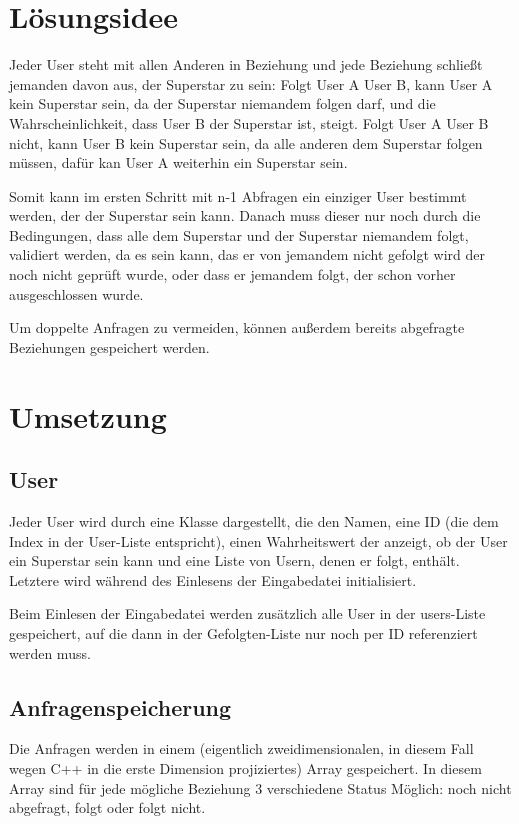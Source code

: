 \documentclass[a4paper,10pt,ngerman]{scrartcl}
\title{\Aufgabe}
\author{\Name\\Team-ID: \TeamId}
\date{\today}
\begin{document}
\maketitle
\vspace{7\baselineskip}
\tableofcontents
\pagebreak

\section{Lösungsidee}
Jeder User steht mit allen Anderen in Beziehung und jede Beziehung schließt jemanden davon aus, der Superstar zu sein: Folgt User A User B, kann User A kein Superstar sein, da der Superstar niemandem folgen darf, und die Wahrscheinlichkeit, dass User B der Superstar ist, steigt. Folgt User A User B nicht, kann User B kein Superstar sein, da alle anderen dem Superstar folgen müssen, dafür kan User A weiterhin ein Superstar sein.

Somit kann im ersten Schritt mit n-1 Abfragen ein einziger User bestimmt werden, der der Superstar sein kann. Danach muss dieser nur noch durch die Bedingungen, dass alle dem Superstar und der Superstar niemandem folgt, validiert werden, da es sein kann, das er von jemandem nicht gefolgt wird der noch nicht geprüft wurde, oder dass er jemandem folgt, der schon vorher ausgeschlossen wurde.

Um doppelte Anfragen zu vermeiden, können außerdem bereits abgefragte Beziehungen gespeichert werden.

\pagebreak
\section{Umsetzung}

\subsection{User}
Jeder User wird durch eine Klasse dargestellt, die den Namen, eine ID (die dem Index in der User-Liste entspricht), einen Wahrheitswert der anzeigt, ob der User ein Superstar sein kann und eine Liste von Usern, denen er folgt, enthält. Letztere wird während des Einlesens der Eingabedatei initialisiert.

Beim Einlesen der Eingabedatei werden zusätzlich alle User in der users-Liste gespeichert, auf die dann in der Gefolgten-Liste nur noch per ID referenziert werden muss.

\subsection{Anfragenspeicherung}
Die Anfragen werden in einem (eigentlich zweidimensionalen, in diesem Fall wegen C++ in die erste Dimension projiziertes) Array gespeichert. In diesem Array sind für jede mögliche Beziehung 3 verschiedene Status Möglich: noch nicht abgefragt, folgt oder folgt nicht.
\end{document}
